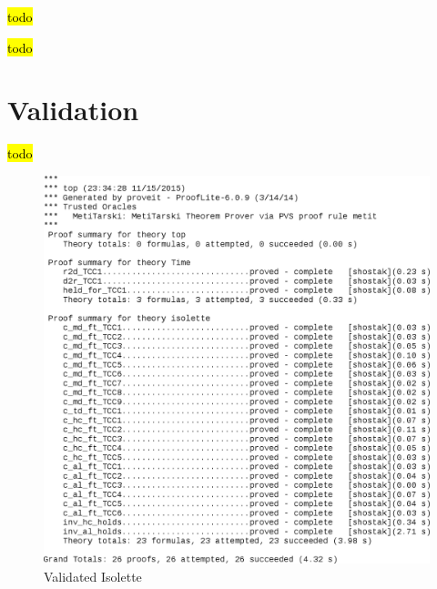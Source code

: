 \documentclass[fontsize=12pt,paper=letter,twoside]{scrartcl}
\begin{document}

\newpage




\newpage



\newpage
\hl{todo}


\newpage

\hl{todo}


\newpage




\newpage


\section{Validation}
\hl{todo}
\begin{figure}[!htb]
\begin{center}
\includegraphics[width=1\textwidth]{pics/top.png}
\end{center}
\caption{Validated Isolette}
\label{proofs}
\end{figure}
\end{document}
